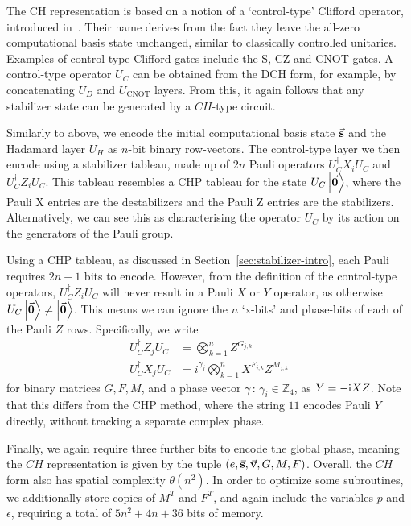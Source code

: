 The CH representation is based on a notion of a `control-type' Clifford operator, introduced in~\cite{Bravyi2018}. Their name derives from the fact they leave the all-zero computational basis state unchanged, similar to classically controlled unitaries. Examples of control-type Clifford gates include the S, CZ and CNOT gates. A control-type operator $U_{C}$ can be obtained from the DCH form, for example, by concatenating $U_{D}$ and $U_{\text{CNOT}}$ layers. From this, it again follows that any stabilizer state can be generated by a $CH$-type circuit.\par
Similarly to above, we encode the initial computational basis state $\va{s}$ and the Hadamard layer $U_{H}$ as $n$-bit binary row-vectors. The control-type layer we then encode using a stabilizer tableau, made up of $2n$ Pauli operators
$U_{C}^{\dagger}X_{i}U_{C}$ and $U_{C}^{\dagger}Z_{i}U_{C}$. This tableau resembles a CHP tableau for the state $U_{C}\ket{\va{0}}$, where the Pauli X entries are the destabilizers and the Pauli Z entries are the stabilizers. Alternatively, we can see this as characterising the operator $U_{C}$ by its action on the generators of the Pauli group.\par
Using a CHP tableau, as discussed in Section~\ref{sec:stabilizer-intro}, each Pauli requires $2n+1$ bits to encode. However, from the definition of the control-type operators, $U_{C}^{\dagger}Z_{i}U_{C}$ will never result in a Pauli $X$ or $Y$ operator, as otherwise $U_{C}\ket{\va{0}}\neq\ket{\va{0}}$. This means we can ignore the $n$ `x-bits' and phase-bits of each of the Pauli $Z$ rows. Specifically, we write
\begin{align}
U_{C}^{\dagger}Z_{j}U_{C} &= \bigotimes_{k=1}^{n} Z^{G_{j,k}} \\
U_{C}^{\dagger}X_{j}U_{C} &= i^{\gamma_{j}}\bigotimes_{k=1}^{n}X^{F_{j,k}}Z^{M_{j,k}}
\end{align}
for binary matrices $G, F, M$, and a phase vector $\gamma\,:\,\gamma_{i}\in\mathbb{Z}_{4}$, as $Y=-\mathrm{i} XZ$. Note that this differs from the CHP method, where the string $11$ encodes Pauli $Y$ directly, without tracking a separate complex phase.\par
Finally, we again require three further bits to encode the global phase, meaning the $CH$ representation is given by the tuple $(e, \va{s}, \va{v}, G, M, F)$. Overall, the $CH$ form  also has spatial complexity $\theta(n^{2})$.  In order to optimize some subroutines, we additionally store copies of $M^{T}$ and $F^{T}$, and again include the variables $p$ and $\epsilon$,  requiring a total of $5n^{2}+4n+36$ bits of memory.
